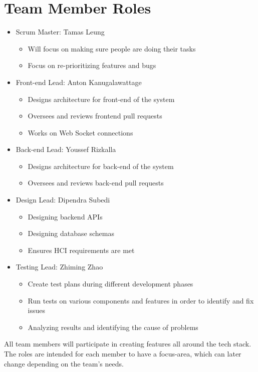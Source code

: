 \documentclass{article}
\begin{document}
\section{Team Member Roles}
\begin{itemize}
\item Scrum Master: Tamas Leung
\begin{itemize}
    \item Will focus on making sure people are doing their tasks
    \item Focus on re-prioritizing features and bugs
\end{itemize}
\item Front-end Lead: Anton Kanugalawattage
\begin{itemize}
    \item Designs architecture for front-end of the system
    \item Oversees and reviews frontend pull requests
    \item Works on Web Socket connections
\end{itemize}
\item Back-end Lead: Youssef Rizkalla
\begin{itemize}
    \item Designs architecture for back-end of the system
    \item Oversees and reviews back-end pull requests
\end{itemize}
\item Design Lead: Dipendra Subedi
\begin{itemize}
    \item Designing backend APIs
    \item Designing database schemas
    \item Ensures HCI requirements are met
\end{itemize}
\item Testing Lead: Zhiming Zhao
\begin{itemize}
    \item Create test plans during different development phases
    \item Run tests on various components and features in order to identify and fix issues
    \item Analyzing results and identifying the cause of problems
\end{itemize}
\end{itemize}   
All team members will participate in creating features all around the tech stack. The roles are intended for each member to have a focus-area, which can later change depending on the team's needs.
\end{document}
